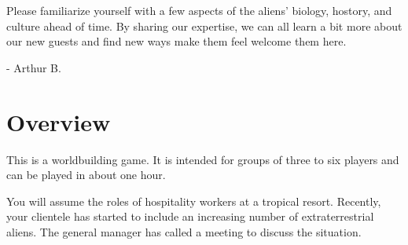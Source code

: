 \documentclass[a6paper, 11pt, parskip=half, DIV=15]{scrartcl}
\begin{document}
Please familiarize yourself with a few aspects of the aliens' biology, hostory, and culture ahead of time.
By sharing our expertise, we can all learn a bit more about our new guests and find new ways make them feel welcome them here.

\hspace{4.5cm}\huge\setmainfont{Caveat}- Arthur B.
\setmainfont{Quicksand}
\normalsize

\newpage
\enlargethispage{1.75\baselineskip}

\section*{Overview}
This is a worldbuilding game. It is intended for groups of three to six players and can be played in about one hour.

You will assume the roles of hospitality workers at a tropical resort. Recently, your clientele has started to include an increasing number of extraterrestrial aliens. The general manager has called a meeting to discuss the situation.%

\vfill

\begin{center}
\end{center}
\end{document}
